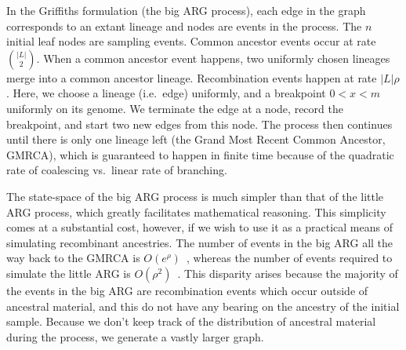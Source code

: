 \documentclass{article}
\begin{document}
In the Griffiths formulation (the big ARG process), each edge in the graph corresponds to an extant
lineage and nodes are events in the process. The $n$ initial leaf nodes are
sampling events. Common ancestor events occur at rate $\binom{|L|}{2}$.
When a common ancestor event happens, two uniformly chosen lineages
merge into a common ancestor lineage.
Recombination events happen at rate $|L| \rho$. Here, we choose a lineage (i.e.\ edge) uniformly,
and a breakpoint $0 < x < m$ uniformly on its genome. We terminate the edge at a
node, record the breakpoint, and start two new edges from this node. The process
then continues until there is only one lineage left (the Grand Most Recent
Common Ancestor, GMRCA), which is guaranteed to
happen in finite time because of the quadratic rate of coalescing vs.\ linear rate of branching.

The state-space of the big ARG process is much simpler than that of the little ARG process,
which greatly facilitates mathematical reasoning. This simplicity comes at a
substantial cost, however, if we wish to use it as a practical means of
simulating recombinant ancestries.
The number of events in the big ARG all the way back to the GMRCA
is $O(e^\rho)$~\citep{griffiths1997ancestral}, whereas the number
of events required to simulate the little ARG is
$O(\rho^2)$~\citep{hein2004gene,baumdicker2021efficient}.
This disparity arises because the majority of the events in the big ARG are
recombination events which occur outside of ancestral material,
and this do not have any bearing on the ancestry of the initial sample.
Because we don't keep track of the distribution of ancestral material during the process,
we generate a vastly larger graph.
\end{document}
